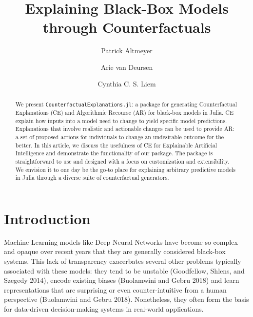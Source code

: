 \documentclass{juliacon}
\title{Explaining Black-Box Models through Counterfactuals}
\author[1]{Patrick Altmeyer}
\author[1]{Arie van Deursen}
\author[1]{Cynthia C. S. Liem}
\affil[1]{Delft University of Technology}
\date{}
\begin{document}
\maketitle

\begin{abstract}

We present \texttt{CounterfactualExplanations.jl}: a package for
generating Counterfactual Explanations (CE) and Algorithmic Recourse
(AR) for black-box models in Julia. CE explain how inputs into a model
need to change to yield specific model predictions. Explanations that
involve realistic and actionable changes can be used to provide AR: a
set of proposed actions for individuals to change an undesirable outcome
for the better. In this article, we discuss the usefulness of CE for
Explainable Artificial Intelligence and demonstrate the functionality of
our package. The package is straightforward to use and designed with a
focus on customization and extensibility. We envision it to one day be
the go-to place for explaining arbitrary predictive models in Julia
through a diverse suite of counterfactual generators.
\end{abstract}



\setcounter{page}{1}

\ifdefined\Shaded\renewenvironment{Shaded}{\begin{tcolorbox}[borderline west={3pt}{0pt}{shadecolor}, sharp corners, boxrule=0pt, frame hidden, interior hidden, enhanced, breakable]}{\end{tcolorbox}}\fi

\hypertarget{sec-intro}{%
\section{Introduction}\label{sec-intro}}

Machine Learning models like Deep Neural Networks have become so complex
and opaque over recent years that they are generally considered
black-box systems. This lack of transparency exacerbates several other
problems typically associated with these models: they tend to be
unstable (Goodfellow, Shlens, and Szegedy 2014), encode existing biases
(Buolamwini and Gebru 2018) and learn representations that are
surprising or even counter-intuitive from a human perspective
(Buolamwini and Gebru 2018). Nonetheless, they often form the basis for
data-driven decision-making systems in real-world applications.
\end{document}
